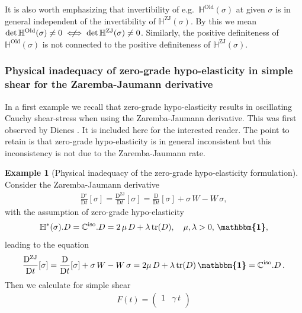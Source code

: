 \documentclass[10pt]{article}
\newcounter{theoremCounter}
\numberwithin{theoremCounter}{section}
\theoremstyle{plain}
\theoremstyle{definition}
\newtheorem{example}[theoremCounter]{Example}
\newcommand{\id}{{\boldsymbol{\mathbbm{1}}}}
\newcommand{\DD}{\mathrm{D}}
\newcommand{\notiff}{%
  \mathrel{{\ooalign{\hidewidth$\not\phantom{"}$\hidewidth\cr$\iff$}}}}
\DeclareMathOperator{\tr}{tr}
\DeclareMathOperator{\iso}{iso}
\DeclareMathOperator{\Old}{Old}
\DeclareMathOperator{\ZJ}{ZJ}
\def\tr{\textnormal{tr}}
\def\C{\mathbb{C}}
\def\H{\mathbb{H}}
\numberwithin{equation}{section}
\begin{document}
\begin{appendix}
It is also worth emphasizing that invertibility of e.g.~$\H^{\Old}(\sigma)$ at given $\sigma$ is in general independent of the invertibility of $\H^{\ZJ}(\sigma)$. By this we mean $\det \H^{\Old}(\sigma) \neq 0 \notiff \det \H^{\ZJ}(\sigma) \neq 0$. Similarly, the positive definiteness of $\H^{\Old}(\sigma)$ is not connected to the positive definiteness of $\H^{\ZJ}(\sigma)$.
%

















\subsubsection{Physical inadequacy of zero-grade hypo-elasticity in simple shear for the Zaremba-Jaumann derivative} \label{appendixsimpleshear}
%
In a first example we recall that zero-grade hypo-elasticity results in oscillating Cauchy shear-stress when using the Zaremba-Jaumann derivative. This was first observed by Dienes \cite{dienes1979}. It is included here for the interested reader. The point to retain is that zero-grade hypo-elasticity is in general inconsistent but this inconsistency is not due to the Zaremba-Jaumann rate.
%
\begin{example}[Physical inadequacy of the zero-grade hypo-elasticity formulation]
Consider the Zaremba-Jaumann derivative 
	\begin{align}
	\frac{\DD^{\circ}}{\DD t}[\sigma] = \frac{\DD^{\ZJ}}{\DD t}[\sigma] = \frac{\DD}{\DD t}[\sigma] + \sigma \, W - W \, \sigma,
	\end{align}
with the assumption of zero-grade hypo-elasticity
	\begin{align}
	\H^*(\sigma).D = \C^{\iso}.D = 2 \, \mu \, D + \lambda \, \tr(D), \quad \mu,\lambda>0,\, \id,
	\end{align}
leading to the equation
	\begin{align}
	\label{eqZJmatrixcalc001}
	\frac{\DD^{\ZJ}}{\DD t}[\sigma] = \frac{\DD}{\DD t}[\sigma] + \sigma \, W - W \, \sigma = 2\mu \, D + \lambda \, \tr(D) \, \id = \C^{\iso}.D \, .
	\end{align}
Then we calculate for simple shear
	\begin{align*}
	F(t) =
	\begin{pmatrix}
	1 & \gamma \, t \\

\end{pmatrix}
\end{align*}
\end{example}
\end{appendix}
\end{document}
